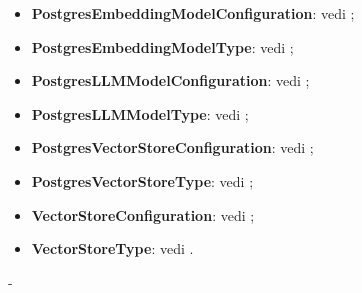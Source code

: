 \documentclass[10pt, a4paper]{article}
\begin{document}
\begin{itemize}
    \item \textbf{PostgresEmbeddingModelConfiguration}: vedi ;
    \item \textbf{PostgresEmbeddingModelType}: vedi ;
    
    \item \textbf{PostgresLLMModelConfiguration}: vedi ;
    \item \textbf{PostgresLLMModelType}: vedi ;

    \item \textbf{PostgresVectorStoreConfiguration}: vedi ;
    \item \textbf{PostgresVectorStoreType}: vedi ;

    \item \textbf{VectorStoreConfiguration}: vedi ;
    \item \textbf{VectorStoreType}: vedi .
   
\end{itemize}
 
   
 -
\end{document}
